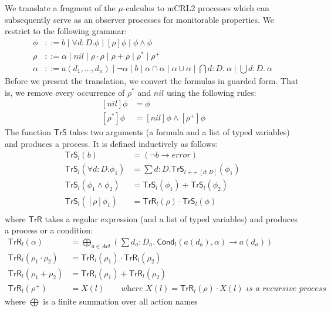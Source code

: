 \documentclass[letter]{llncs}
\newcommand{\Tr}{\ensuremath{\mathsf{TrS}}}
\newcommand{\TrR}{\ensuremath{\mathsf{TrR}}}
\newcommand{\TrA}{\ensuremath{\mathsf{Cond}}}
\newcommand{\concat}{\ensuremath{\mathop{+\!\!+}}}
\begin{document}
We translate a fragment of the $\mu$-calculus to mCRL2 processes which
can subsequently serve as an observer processes for monitorable properties.
We restrict to the following grammar:
\vspace{-7 pt}
\[
\begin{array}{ll}
\phi & ::= b \mid \forall d{:}D.\phi \mid [\rho]\phi \mid \phi\wedge \phi\\
\rho & ::= \alpha \mid nil \mid \rho\cdot \rho \mid
              \rho+\rho \mid
              \rho^* \mid \rho^+ \\
\alpha & ::=  a(d_1,\dots,d_n) \mid \neg \alpha \mid b \mid
              \alpha \cap \alpha \mid \alpha \cup \alpha \mid
              \bigcap d{:}D.~\alpha \mid \bigcup d{:}D.~\alpha
\end{array}
\]
Before we present the translation, we convert the formulas in
guarded form. That is, we remove every occurrence of $\rho^*$ and $nil$ using
the following rules:
\[
\begin{array}{ll}
~
[nil]\phi &= \phi \\
~[\rho^*]\phi &= [nil]\phi \wedge [\rho^+]\phi
\end{array}
\]
The function $\Tr$ takes two arguments (a formula and a list of typed
variables) and produces a process. It is defined inductively as follows:
\[
\begin{array}{ll}
\Tr_l(b) &= (\neg b \to \textit{error}) \\
\Tr_l(\forall d:D.\phi_1) & = \sum d{:}D. \Tr_{l\concat [d:D]} (\phi_1) \\
\Tr_l(\phi_1 \wedge \phi_2) & = \Tr_l(\phi_1) + \Tr_l(\phi_2) \\
\Tr_l([\rho]\phi_1) & = \TrR_l(\rho) \cdot \Tr_l(\phi) \\
\end{array}
\]
where $\TrR$ takes a regular expression (and a list of typed variables)
and produces a process or a condition:
\[
\begin{array}{ll}
\TrR_l(\alpha) &= \bigoplus\limits_{a \in Act} (\sum d_a{:}D_a.~ \TrA_l(a(d_a),\alpha) \to a(d_a)) \\
\TrR_l(\rho_1 \cdot \rho_2) & = \TrR_l(\rho_1) \cdot \TrR_l(\rho_2) \\
\TrR_l(\rho_1 + \rho_2) &= \TrR_l(\rho_1) + \TrR_l(\rho_2) \\
\TrR_l(\rho^+) & = X(l) \qquad \textit{where $X(l) = \TrR_l(\rho)\cdot X(l)$ is
a recursive process} 
\end{array}
\]
where $\bigoplus$ is a finite summation over all action names
\end{document}
